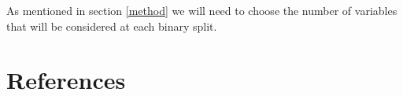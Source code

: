 \documentclass[preprint,12pt]{elsarticle}
\begin{document}
As mentioned in section \ref{method} we will need to choose the number of variables that will be considered at each binary split. 

\section{References}








\end{document}
